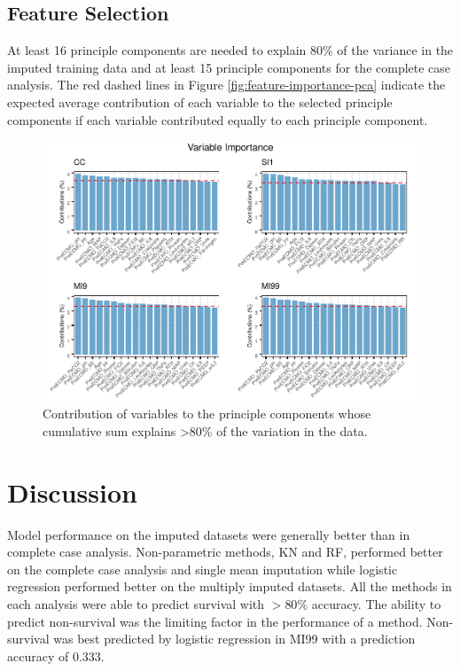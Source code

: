 \documentclass[12pt,]{article}
\begin{document}
\subsection{Feature Selection}\label{feature-selection-1}

At least 16 principle components are needed to explain 80\% of the
variance in the imputed training data and at least 15 principle
components for the complete case analysis. The red dashed lines in
Figure \ref{fig:feature-importance-pca} indicate the expected average
contribution of each variable to the selected principle components if
each variable contributed equally to each principle component.

\begin{figure}[H]

{\centering \includegraphics[width=1\linewidth]{figure/graphics-unnamed-chunk-8-1} 

}

\caption{\label{fig:feature-importance-pca}Contribution of variables to the principle components whose cumulative sum explains >80\% of the variation in the data.}\label{fig:unnamed-chunk-8}
\end{figure}

\newpage

\section{Discussion}\label{discussion}

Model performance on the imputed datasets were generally better than in
complete case analysis. Non-parametric methods, KN and RF, performed
better on the complete case analysis and single mean imputation while
logistic regression performed better on the multiply imputed datasets.
All the methods in each analysis were able to predict survival with
\(>80\%\) accuracy. The ability to predict non-survival was the limiting
factor in the performance of a method. Non-survival was best predicted
by logistic regression in MI99 with a prediction accuracy of \(0.333\).
\end{document}
